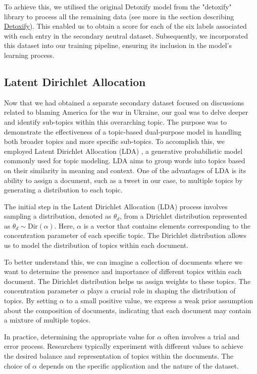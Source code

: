 To achieve this, we utilised the original Detoxify model from the "detoxify" library \cite{Detoxify} to process all the remaining data (see more in the section describing \hyperref[sec:Detoxify]{Detoxify}). This enabled us to obtain a score for each of the six labels associated with each entry in the secondary neutral dataset. Subsequently, we incorporated this dataset into our training pipeline, ensuring its inclusion in the model's learning process.

\subsection{Latent Dirichlet Allocation}
\label{topic_based_sec_data}

Now that we had obtained a separate secondary dataset focused on discussions related to blaming America for the war in Ukraine, our goal was to delve deeper and identify sub-topics within this overarching topic. The purpose was to demonstrate the effectiveness of a topic-based dual-purpose model in handling both broader topics and more specific sub-topics. To accomplish this, we employed Latent Dirichlet Allocation (LDA) \cite{lda}, a generative probabilistic model commonly used for topic modeling. LDA aims to group words into topics based on their similarity in meaning and context. One of the advantages of LDA is its ability to assign a document, such as a tweet in our case, to multiple topics by generating a distribution to each topic.

The initial step in the Latent Dirichlet Allocation (LDA) process involves sampling a distribution, denoted as $\theta_{d}$, from a Dirichlet distribution represented as $\theta_{d} \sim \text{Dir}(\alpha)$. Here, $\alpha$ is a vector that contains elements corresponding to the concentration parameter of each specific topic. The Dirichlet distribution allows us to model the distribution of topics within each document.

To better understand this, we can imagine a collection of documents where we want to determine the presence and importance of different topics within each document. The Dirichlet distribution helps us assign weights to these topics. The concentration parameter $\alpha$ plays a crucial role in shaping the distribution of topics. By setting $\alpha$ to a small positive value, we express a weak prior assumption about the composition of documents, indicating that each document may contain a mixture of multiple topics.

In practice, determining the appropriate value for $\alpha$ often involves a trial and error process. Researchers typically experiment with different values to achieve the desired balance and representation of topics within the documents. The choice of $\alpha$ depends on the specific application and the nature of the dataset.

